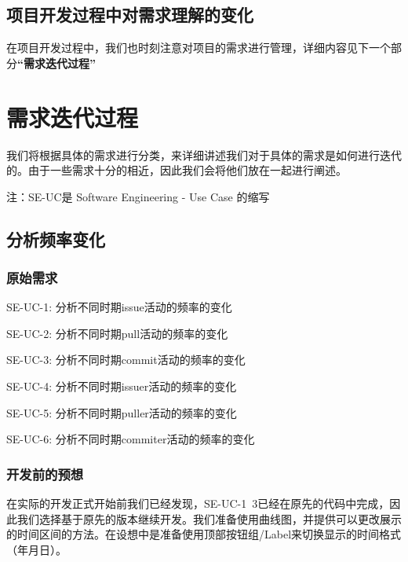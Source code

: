 \documentclass[a4paper,20pt]{article}
\begin{document}
\subsection{项目开发过程中对需求理解的变化}
在项目开发过程中，我们也时刻注意对项目的需求进行管理，详细内容见下一个部分\textbf{“需求迭代过程”}

\section{需求迭代过程}
我们将根据具体的需求进行分类，来详细讲述我们对于具体的需求是如何进行迭代的。由于一些需求十分的相近，因此我们会将他们放在一起进行阐述。\par
注：SE-UC是 Software Engineering - Use Case 的缩写

\subsection{分析频率变化}
\subsubsection{原始需求}
SE-UC-1: 分析不同时期issue活动的频率的变化\par
SE-UC-2: 分析不同时期pull活动的频率的变化\par
SE-UC-3: 分析不同时期commit活动的频率的变化\par
SE-UC-4: 分析不同时期issuer活动的频率的变化\par
SE-UC-5: 分析不同时期puller活动的频率的变化\par
SE-UC-6: 分析不同时期commiter活动的频率的变化\par
\subsubsection{开发前的预想}
在实际的开发正式开始前我们已经发现，SE-UC-1~3已经在原先的代码中完成，因此我们选择基于原先的版本继续开发。我们准备使用曲线图，并提供可以更改展示的时间区间的方法。在设想中是准备使用顶部按钮组/Label来切换显示的时间格式（年月日）。
\end{document}
